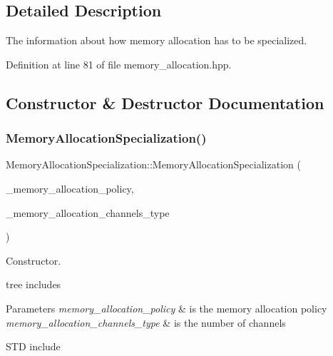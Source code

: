 \subsection{Detailed Description}
The information about how memory allocation has to be specialized. 

Definition at line 81 of file memory\+\_\+allocation.\+hpp.



\subsection{Constructor \& Destructor Documentation}
\mbox{\label{classMemoryAllocationSpecialization_a63ab1bb8c2d88512769b48ccb90efb8b}} 
\subsubsection{\texorpdfstring{Memory\+Allocation\+Specialization()}{MemoryAllocationSpecialization()}}
{\footnotesize\ttfamily Memory\+Allocation\+Specialization\+::\+Memory\+Allocation\+Specialization (\begin{DoxyParamCaption}\item[{const \hyperlink{memory__allocation_8hpp_aad85c6dac5893e8093336373dd19539b}{Memory\+Allocation\+\_\+\+Policy}}]{\+\_\+memory\+\_\+allocation\+\_\+policy,  }\item[{const \hyperlink{memory__allocation_8hpp_a84978b137ea64df6a0ffc0cc92cbdd3f}{Memory\+Allocation\+\_\+\+Channels\+Type}}]{\+\_\+memory\+\_\+allocation\+\_\+channels\+\_\+type }\end{DoxyParamCaption})}



Constructor. 

tree includes


\begin{DoxyParams}{Parameters}
{\em memory\+\_\+allocation\+\_\+policy} & is the memory allocation policy \\
\hline
{\em memory\+\_\+allocation\+\_\+channels\+\_\+type} & is the number of channels\\
\hline
\end{DoxyParams}
S\+TD include 


